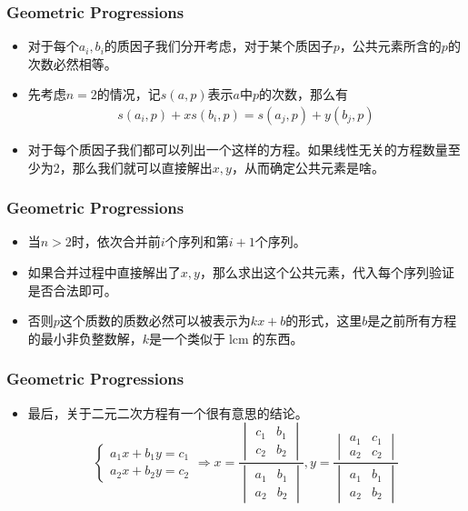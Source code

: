 \documentclass{beamer}
\begin{document}
\begin{frame}
    \frametitle{Geometric Progressions}
    \begin{itemize}
        \item 对于每个$a_i, b_i$的质因子我们分开考虑，对于某个质因子$p$，公共元素所含的$p$的次数必然相等。
        \item 先考虑$n = 2$的情况，记$s(a, p)$表示$a$中$p$的次数，那么有
        $$\begin{aligned}
            s(a_i, p) + xs(b_i, p) = s(a_j, p) + y(b_j, p)
        \end{aligned}$$
        \item 对于每个质因子我们都可以列出一个这样的方程。如果线性无关的方程数量至少为$2$，那么我们就可以直接解出$x, y$，从而确定公共元素是啥。
    \end{itemize}
\end{frame}

\begin{frame}
    \frametitle{Geometric Progressions}
    \begin{itemize}
        \item 当$n > 2$时，依次合并前$i$个序列和第$i + 1$个序列。
        \item 如果合并过程中直接解出了$x, y$，那么求出这个公共元素，代入每个序列验证是否合法即可。
        \item 否则$p$这个质数的质数必然可以被表示为$kx + b$的形式，这里$b$是之前所有方程的最小非负整数解，$k$是一个类似于$\operatorname{lcm}$的东西。
    \end{itemize}
\end{frame}

\begin{frame}
    \frametitle{Geometric Progressions}
    \begin{itemize}
        \item 最后，关于二元二次方程有一个很有意思的结论。
        $$\begin{cases}a_1x + b_1y = c_1\\ a_2x + b_2y = c_2\end{cases} \Rightarrow x=\frac{\begin{vmatrix}c_1&b_1\\c_2&b_2\end{vmatrix}}{\begin{vmatrix}a_1&b_1\\a_2&b_2\end{vmatrix}},y=\frac{\begin{vmatrix}a_1&c_1\\a_2&c_2\end{vmatrix}}{\begin{vmatrix}a_1&b_1\\a_2&b_2\end{vmatrix}}$$
    \end{itemize}
\end{frame}
\end{document}
